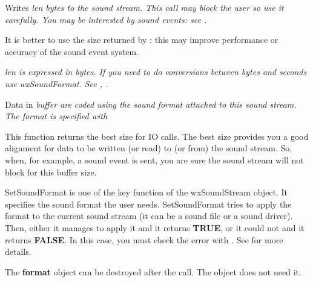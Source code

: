 Writes \it{len} bytes to the sound stream. This call may block the user so
use it carefully. You may be interested by sound events: see
.

It is better to use the size returned by : this may improve performance or accuracy of the
sound event system.


\it{len} is expressed in bytes. If you need to do conversions between bytes
and seconds use wxSoundFormat.
See , .


Data in \it{buffer} are coded using the sound format attached to this sound 
stream. The format is specified with 


\label{wxsoundstreamgetbestsize}


This function returns the best size for IO calls. The best size provides you
a good alignment for data to be written (or read) to (or from) the sound stream.
So, when, for example, a sound event is sent, you are sure the sound stream
will not block for this buffer size.


\label{wxsoundstreamsetsoundformat}

SetSoundFormat is one of the key function of the wxSoundStream object. It specifies
the sound format the user needs. SetSoundFormat tries to apply the format to the
current sound stream (it can be a sound file or a sound driver). 
Then, either it manages to apply it and it returns {\bf TRUE}, or it could not and
it returns {\bf FALSE}. In this case, you must check the error with
. See
 for more details.


The {\bf format} object can be destroyed after the call. The object does not need it.

